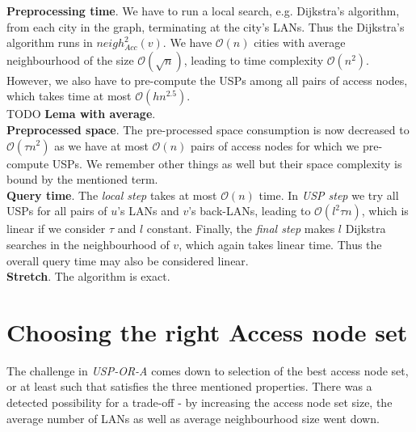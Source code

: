 	\textbf{Preprocessing time}. We have to run a local search, e.g. Dijkstra's algorithm, from each city in the graph, terminating at the city's LANs. Thus the Dijkstra's algorithm runs in $neigh_{Acc}^{2}(v)$. We have $\mathcal{O}(n)$ cities with average neighbourhood of the size $\mathcal{O}(\sqrt{n})$, leading to time complexity $\mathcal{O}(n^{2})$. However, we also have to pre-compute the USPs among all pairs of access nodes, which takes time at most $\mathcal{O}(hn^{2.5})$. \\
	
	TODO \textbf{Lema with average}. \\
	
	\textbf{Preprocessed space}. The pre-processed space consumption is now decreased to $\mathcal{O}(\tau n^{2})$ as we have at most $\mathcal{O}(n)$ pairs of access nodes for which we pre-compute USPs. We remember other things as well but their space complexity is bound by the mentioned term. \\
	
		\textbf{Query time}. The \textit{local step} takes at most $\mathcal{O}(n)$ time. In \textit{USP step} we try all USPs for all pairs of $u$'s LANs and $v$'s back-LANs, leading to $\mathcal{O}(l^{2} \tau n)$, which is linear if we consider $\tau$ and $l$ constant. Finally, the \textit{final step} makes $l$ Dijkstra searches in the neighbourhood of $v$, which again takes linear time. Thus the overall query time may also be considered linear. \\
	
	\textbf{Stretch}. The algorithm is exact. \\
	    
	\section{Choosing the right Access node set}
	
	The challenge in \textit{USP-OR-A} comes down to selection of the best access node set, or at least such that satisfies the three mentioned properties. There was a detected possibility for a trade-off - by increasing the access node set size, the average number of LANs as well as average neighbourhood size went down. \\
	
